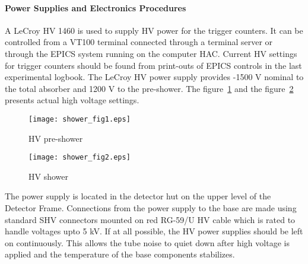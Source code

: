 \documentclass[12pt]{article}
\begin{document}
\paragraph{Power Supplies and Electronics Procedures} 
A LeCroy HV 1460 is used to supply HV power for the trigger
counters. It can be controlled from a VT100 terminal connected through
a terminal server or through the EPICS system running on the computer
HAC.  Current HV settings for trigger counters should be found from
print-outs of EPICS controls in the last experimental logbook. The
LeCroy HV power supply provides -1500 V nominal to the total absorber
and 1200 V to the pre-shower. The figure~\ref{hv_psh} and the
figure~\ref{hv_sh} presents actual high voltage settings.
%
\begin{figure}
\begin{center}
\texttt{[image: shower\_fig1.eps]}
{\linespread{1.}
\caption[High voltage settings of pre-shower]{HV pre-shower}
\label{hv_psh}}
\end{center}
\end{figure}
%
\begin{figure}
\begin{center}
\texttt{[image: shower\_fig2.eps]}
{\linespread{1.}
\caption[High voltage settings of shower]{HV shower}
\label{hv_sh}}
\end{center}
\end{figure}
%

The power supply is located in the detector hut on the upper level of
the Detector Frame. Connections from the power supply to the base are
made using standard SHV connectors mounted on red RG-59/U HV cable
which is rated to handle voltages upto 5 kV.  If at all possible, the
HV power supplies should be left on continuously.  This allows the
tube noise to quiet down after high voltage is applied and the
temperature of the base components stabilizes.
%
\end{document}
